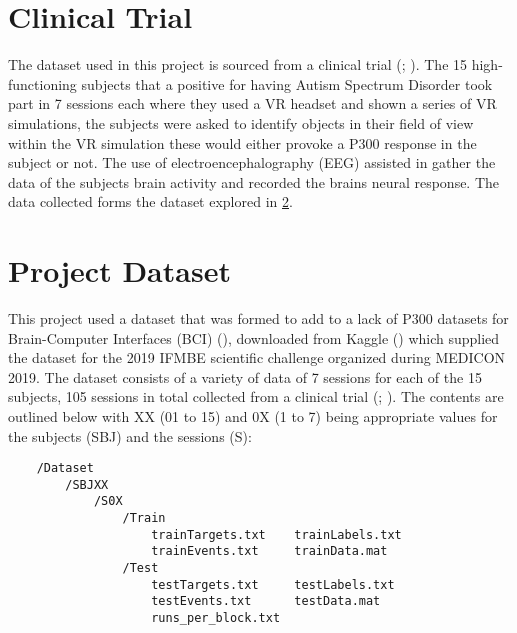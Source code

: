 \section{Clinical Trial}
\label{Clinical Trial Section}

The dataset used in this project is sourced from a clinical trial (\cite{ClinicalTrialPaper}; \cite{ClinicalTrialTechnicalPaper}). The 15 high-functioning subjects that a positive for having Autism Spectrum Disorder took part in 7 sessions each where they used a VR headset and shown a series of VR simulations, the subjects were asked to identify objects in their field of view within the VR simulation these would either provoke a P300 response in the subject or not. The use of electroencephalography (EEG) assisted in gather the data of the subjects brain activity and recorded the brains neural response. The data collected forms the dataset explored in \cref{Project Dataset Section}.

\section{Project Dataset}
\label{Project Dataset Section}

This project used a dataset that was formed to add to a lack of P300 datasets for Brain-Computer Interfaces (BCI) (\cite{DatasetPaper}), downloaded from Kaggle (\cite{Kaggle}) which supplied the dataset for the  2019 IFMBE scientific challenge organized during MEDICON 2019. The dataset consists of a variety of data of 7 sessions for each of the 15 subjects, 105 sessions in total collected from a clinical trial (\cite{ClinicalTrialPaper}; \cite{ClinicalTrialTechnicalPaper}). The contents are outlined below with XX (01 to 15) and 0X (1 to 7) being appropriate values for the subjects (SBJ) and the sessions (S):

\begin{center}
\begin{verbatim}
    /Dataset
        /SBJXX
            /S0X
                /Train
                    trainTargets.txt    trainLabels.txt
                    trainEvents.txt     trainData.mat
                /Test
                    testTargets.txt     testLabels.txt
                    testEvents.txt      testData.mat
                    runs_per_block.txt
\end{verbatim}
\end{center}

